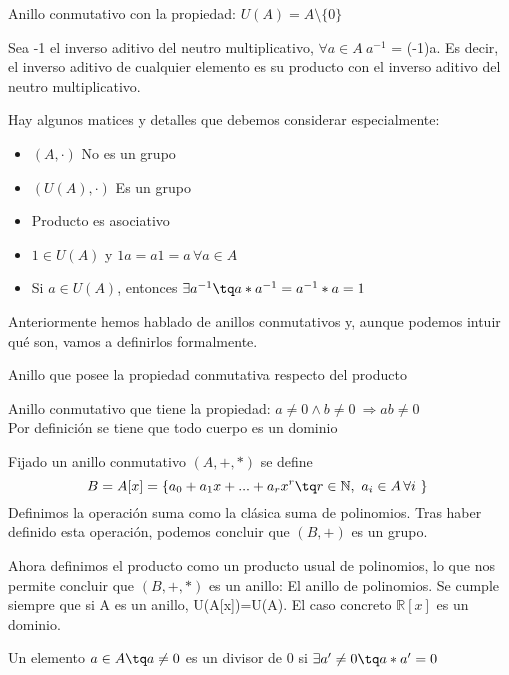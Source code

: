 \documentclass[nochap]{apuntes}
\begin{document}
\begin{defn}[Cuerpo]
 Anillo conmutativo con la propiedad: $U(A)=A \setminus \{0\}$
\end{defn}

\obs Sea -1 el inverso aditivo del neutro multiplicativo, $\forall a \in A \ a^{-1}$ = (-1)a. Es decir, el inverso aditivo de cualquier 
elemento es su producto con el inverso aditivo del neutro multiplicativo.

Hay algunos matices y detalles que debemos considerar especialmente:
\begin{itemize}
 \item $(A, \cdot)$ No es un grupo
 \item $(U(A), \cdot)$ Es un grupo
 \item Producto es asociativo
 \item $1 \in U(A)$ y $1a=a1=a\, \forall a \in A$
 \item Si $a \in U(A)$, entonces $\exists a^{-1} \tq a*a^{-1}=a^{-1}*a=1$
\end{itemize}

Anteriormente hemos hablado de anillos conmutativos y, aunque podemos intuir qué son, vamos a definirlos formalmente.
\begin{defn}
 Anillo que posee la propiedad conmutativa respecto del producto
\end{defn}

\begin{defn}[Dominio]
 Anillo conmutativo que tiene la propiedad: $a\neq 0 \wedge b\neq 0 \ \Rightarrow ab \neq 0$\\
 Por definición se tiene que todo cuerpo es un dominio
\end{defn}

\begin{example}
 Fijado un anillo conmutativo $(A, +, *)$ se define \[ B=A[x]=\{a_0+a_1x+...+a_rx^{r} \tq r \in \mathbb{N}, \ a_i \in A\, \forall i \} \]
 Definimos la operación suma como la clásica suma de polinomios. Tras haber definido esta operación, podemos concluir que $(B, +)$ es un grupo.
 
 Ahora definimos el producto como un producto usual de polinomios, lo que nos permite concluir que $(B, +, *)$ es un anillo: El anillo
 de polinomios.
 Se cumple siempre que si A es un anillo, U(A[x])=U(A). El caso concreto $\mathbb{R}[x]$  es un dominio.
\end{example}

\begin{defn}[Divisor\IS de 0]
 Un elemento $a\in A \tq a\neq 0$  es un divisor de 0 si $\exists a'\neq 0 \tq a*a'=0$
\end{defn}
\end{document}
